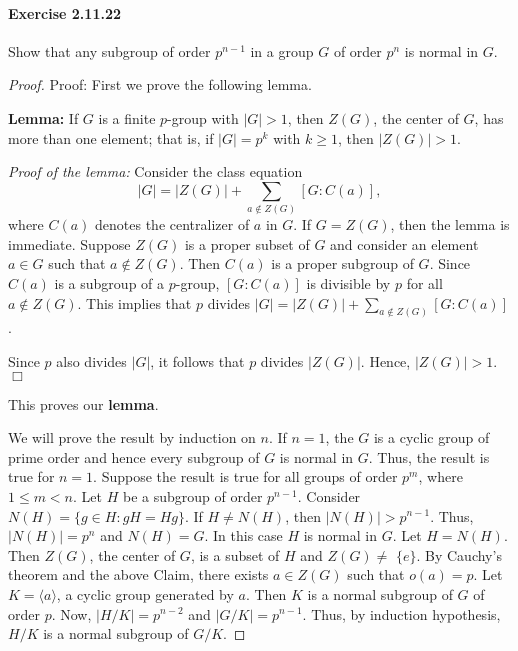 \documentclass{article}
\begin{document}
\paragraph{Exercise 2.11.22} Show that any subgroup of order $p^{n-1}$ in a group $G$ of order $p^n$ is normal in $G$.
\begin{proof}
Proof: First we prove the following lemma.

\textbf{Lemma:} If $G$ is a finite $p$-group with $|G|>1$, then $Z(G)$, the center of $G$, has more than one element; that is, if $|G|=p^k$ with $k\geq 1$, then $|Z(G)|>1$.

\textit{Proof of the lemma:} Consider the class equation
$$
|G|=|Z(G)|+\sum_{a \notin Z(G)}[G: C(a)],
$$
where $C(a)$ denotes the centralizer of $a$ in $G$. If $G=Z(G)$, then the lemma is immediate. Suppose $Z(G)$ is a proper subset of $G$ and consider an element $a\in G$ such that $a\notin Z(G)$. Then $C(a)$ is a proper subgroup of $G$. Since $C(a)$ is a subgroup of a $p$-group, $[G:C(a)]$ is divisible by $p$ for all $a\notin Z(G)$. This implies that $p$ divides $|G|=|Z(G)|+\sum_{a\notin Z(G)} [G:C(a)]$.

Since $p$ also divides $|G|$, it follows that $p$ divides $|Z(G)|$. Hence, $|Z(G)|>1$. $\Box$

This proves our \textbf{lemma}.

We will prove the result by induction on $n$.
If $n=1$, the $G$ is a cyclic group of prime order and hence every subgroup of $G$ is normal in $G$. Thus, the result is true for $n=1$.
Suppose the result is true for all groups of order $p^m$, where $1 \leq m<n$.
Let $H$ be a subgroup of order $p^{n-1}$.
Consider $N(H)=\{g \in H: g H=H g\}$.
If $H \neq N(H)$, then $|N(H)|>p^{n-1}$. Thus, $|N(H)|=p^n$ and $N(H)=G$.
In this case $H$ is normal in $G$.
Let $H=N(H)$. Then $Z(G)$, the center of $G$, is a subset of $H$ and $Z(G) \neq$ $\{e\}$.
By Cauchy's theorem and the above Claim, there exists $a \in Z(G)$ such that $o(a)=p$.
Let $K=\langle a\rangle$, a cyclic group generated by $a$.
Then $K$ is a normal subgroup of $G$ of order $p$. Now, $|H / K|=p^{n-2}$ and $|G / K|=p^{n-1}$.
Thus, by induction hypothesis, $H / K$ is a normal subgroup of $G / K$.
\end{proof}
\end{document}
